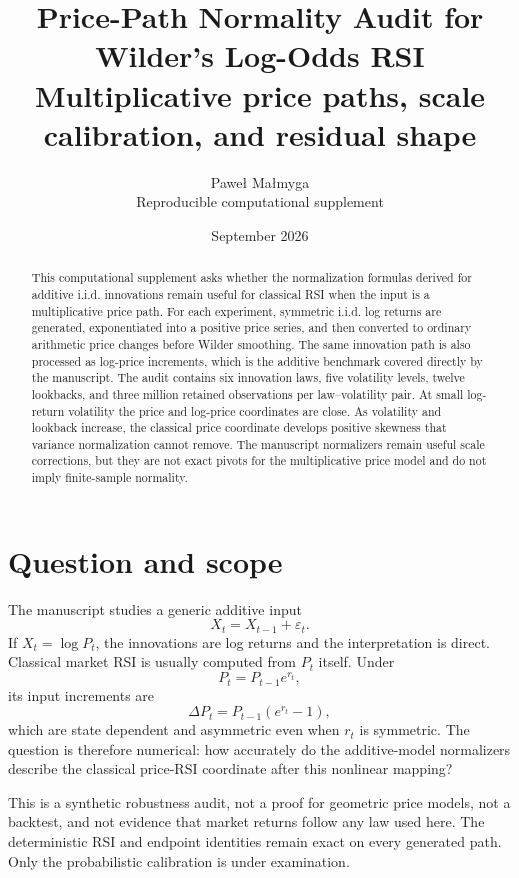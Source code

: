 \documentclass[10pt]{article}
\title{\textbf{Price-Path Normality Audit for Wilder's Log-Odds RSI}\\[5pt]
\large Multiplicative price paths, scale calibration, and residual shape}
\author{Pawe{\l} Ma{\l}myga\\
\small Reproducible computational supplement}
\date{September 2026}
\begin{document}
\maketitle

\begin{abstract}
This computational supplement asks whether the normalization formulas derived for additive i.i.d. innovations remain useful for classical RSI when the input is a multiplicative price path. For each experiment, symmetric i.i.d. log returns are generated, exponentiated into a positive price series, and then converted to ordinary arithmetic price changes before Wilder smoothing. The same innovation path is also processed as log-price increments, which is the additive benchmark covered directly by the manuscript. The audit contains six innovation laws, five volatility levels, twelve lookbacks, and three million retained observations per law--volatility pair. At small log-return volatility the price and log-price coordinates are close. As volatility and lookback increase, the classical price coordinate develops positive skewness that variance normalization cannot remove. The manuscript normalizers remain useful scale corrections, but they are not exact pivots for the multiplicative price model and do not imply finite-sample normality.
\end{abstract}

\section{Question and scope}

The manuscript studies a generic additive input
\begin{equation}X_t=X_{t-1}+\varepsilon_t.\end{equation}
If $X_t=\log P_t$, the innovations are log returns and the interpretation is direct. Classical market RSI is usually computed from $P_t$ itself. Under
\begin{equation}P_t=P_{t-1}e^{r_t},\end{equation}
its input increments are
\begin{equation}\Delta P_t=P_{t-1}(e^{r_t}-1),\end{equation}
which are state dependent and asymmetric even when $r_t$ is symmetric. The question is therefore numerical: how accurately do the additive-model normalizers describe the classical price-RSI coordinate after this nonlinear mapping?

This is a synthetic robustness audit, not a proof for geometric price models, not a backtest, and not evidence that market returns follow any law used here. The deterministic RSI and endpoint identities remain exact on every generated path. Only the probabilistic calibration is under examination.
\end{document}
